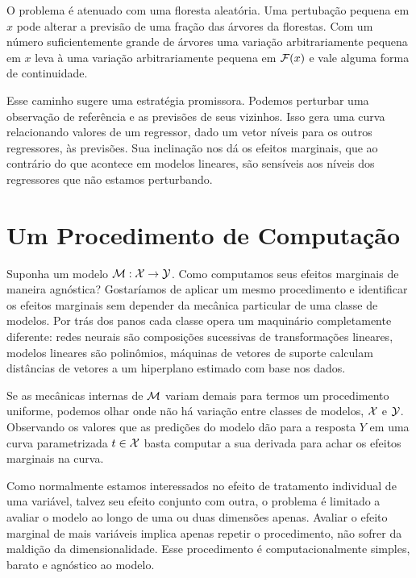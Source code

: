 O problema é atenuado com uma floresta aleatória. Uma pertubação pequena em $x$ pode alterar a previsão de uma fração das árvores da florestas. Com um número suficientemente grande de árvores uma variação arbitrariamente pequena em $x$ leva à uma variação arbitrariamente pequena em $\mathcal{F}(x)$ e vale alguma forma de continuidade. 

Esse caminho sugere uma estratégia promissora. Podemos perturbar uma observação de referência e as previsões de seus vizinhos. Isso gera uma curva relacionando valores de um regressor, dado um vetor níveis para os outros regressores, às previsões. Sua inclinação nos dá os efeitos marginais, que ao contrário do que acontece em modelos lineares, são sensíveis aos níveis dos regressores que não estamos perturbando.

\section{Um Procedimento de Computação}

Suponha um modelo $\mathcal{M} : \mathcal{X} \to \mathcal{Y}$. Como computamos seus efeitos marginais de maneira agnóstica? Gostaríamos de aplicar um mesmo procedimento e identificar os efeitos marginais sem depender da mecânica particular de uma classe de modelos. Por trás dos panos cada classe opera um maquinário completamente diferente: redes neurais são composições sucessivas de transformações lineares, modelos lineares são polinômios, máquinas de vetores de suporte calculam distâncias de vetores a um hiperplano estimado com base nos dados. 

Se as mecânicas internas de $\mathcal{M}$ variam demais para termos um procedimento uniforme, podemos olhar onde não há variação entre classes de modelos, $\mathcal{X}$ e $\mathcal{Y}$. Observando os valores que as predições do modelo dão para a resposta $Y$ em uma curva parametrizada $t \in \mathcal{X}$ basta computar a sua derivada para achar os efeitos marginais na curva. 

Como normalmente estamos interessados no efeito de tratamento individual de uma variável, talvez seu efeito conjunto com outra, o problema é limitado a avaliar o modelo ao longo de uma ou duas dimensões apenas. Avaliar o efeito marginal de mais variáveis implica apenas repetir o procedimento, não sofrer da maldição da dimensionalidade. Esse procedimento é computacionalmente simples, barato e agnóstico ao modelo.
